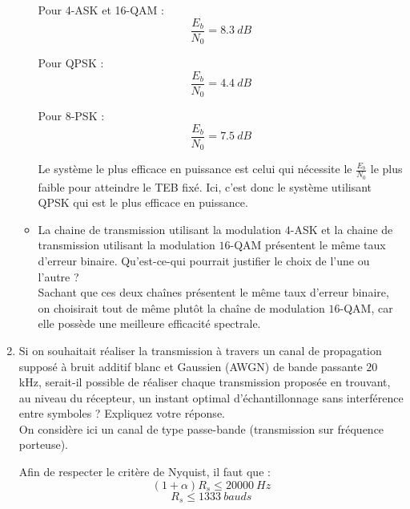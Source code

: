 \documentclass[frenchb]{article}
\begin{document}
\begin{enumerate}
\begin{itemize}
            Pour 4-ASK et 16-QAM : $$ \frac{E_b}{N_0} = 8.3 \ dB$$
            
            Pour QPSK : $$ \frac{E_b}{N_0} = 4.4 \ dB$$
            
            Pour 8-PSK : $$ \frac{E_b}{N_0} = 7.5 \ dB$$
            
            Le système le plus efficace en puissance est celui qui nécessite le $\frac{E_b}{N_0}$ le plus faible pour atteindre le TEB fixé. Ici, c'est donc le système utilisant QPSK qui est le plus efficace en puissance. 
            
            \item La chaine de transmission utilisant la modulation $4$-ASK et la chaine de transmission utilisant la modulation $16$-QAM présentent le même taux d'erreur binaire. Qu'est-ce-qui pourrait justifier le choix de l'une ou l'autre ? \\
            
            \setlength{\parindent}{0.5cm}
            Sachant que ces deux chaînes présentent le même taux d'erreur binaire, on choisirait tout de même plutôt la chaîne de modulation $16$-QAM, car elle possède une meilleure efficacité spectrale. 
            
        \end{itemize}
    \item Si on souhaitait réaliser la transmission à travers un canal de propagation supposé à bruit additif blanc et Gaussien (AWGN) de bande passante $20$ kHz, serait-il possible de réaliser chaque transmission proposée en trouvant, au niveau du récepteur, un instant optimal d'échantillonnage sans interférence entre symboles ? Expliquez votre réponse.\\
            
            \setlength{\parindent}{0.5cm}
            On considère ici un canal de type passe-bande (transmission sur fréquence porteuse). 
            
            Afin de respecter le critère de Nyquist, il faut que :
            $$ (1+\alpha) R_s \leq 20000 \ Hz $$
            $$ R_s \leqslant 1333 \ bauds $$
\end{enumerate}
\end{document}

